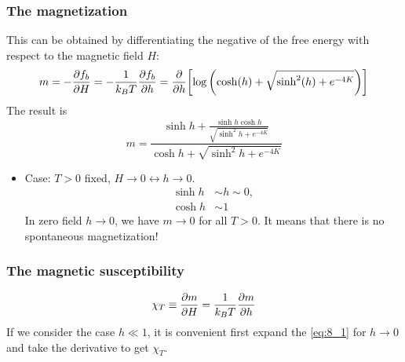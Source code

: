 \documentclass[../main/main.tex]{subfiles}
\begin{document}
\subsubsection{The magnetization}
This can be obtained by differentiating the negative of the free energy with respect to the magnetic field \( H \):
\begin{equation}
  m = - \pdv{f_b}{H} = - \frac{1}{k_B T } \pdv{f_b}{h} = \pdv{}{h} \qty[  \log{\qty( \cosh(h)+\sqrt{\sinh^2(h)+e^{-4K}  } )} ]
\end{equation}
The result is
\begin{equation}
  m =   \frac{\sinh h + \frac{ \sinh h \cosh h}{\sqrt{\sinh^2 h + e^{-4K} }} }{\cosh h + \sqrt{\sinh^2 h + e^{-4K} } }
  \label{eq:8_1}
\end{equation}
\begin{itemize}
\item Case: \( T>0 \) fixed, \( H \rightarrow 0 \leftrightarrow h \rightarrow 0\).
\begin{subequations}
\begin{align}
  \sinh h & \sim h \sim 0, \\ \cosh h &\sim 1
\end{align}
\end{subequations}
In zero field \( h \rightarrow 0 \), we have \( m \rightarrow 0 \) for all \( T>0 \). It means that there is no spontaneous magnetization!
\end{itemize}


\subsubsection{The magnetic susceptibility}
\begin{equation}
  \chi_T  \equiv  \pdv{m}{H} = \frac{1}{k_B T} \pdv{m}{h}
\end{equation}
If we consider the case \( h \ll 1 \), it is convenient first expand the  \eqref{eq:8_1} for \( h \rightarrow 0 \) and take the derivative to get \( \chi _T \).
\end{document}
